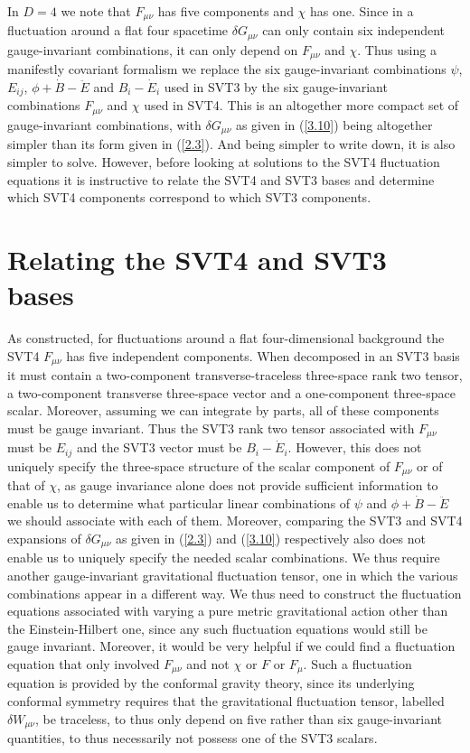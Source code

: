 \documentclass[aps,onecolumn,10pt]{revtex4}
\numberwithin{equation}{section}
\numberwithin{equation}{section}
\begin{document}
In $D=4$ we note that $F_{\mu\nu}$ has five components and $\chi$ has one. Since in a fluctuation around a flat four spacetime $\delta G_{\mu\nu}$ can only contain six independent gauge-invariant combinations, it can only depend on $F_{\mu\nu}$ and $\chi$. Thus using a manifestly covariant formalism we replace the six gauge-invariant combinations $\psi$, $E_{ij}$,  $\phi+\dot{B}-\ddot{E}$ and $B_i-\dot{E}_i$ used in SVT3 by the six gauge-invariant combinations $F_{\mu\nu}$ and $\chi$ used in SVT4. This is an altogether more compact set of gauge-invariant combinations, with $\delta G_{\mu\nu}$ as given in (\ref{3.10}) being altogether simpler than its form given in (\ref{2.3}). And being simpler to write down, it is also simpler to solve. However, before looking at solutions to the SVT4 fluctuation equations it is instructive to relate the SVT4 and SVT3 bases and determine which SVT4 components correspond to which SVT3 components.


\section{Relating the SVT4 and SVT3 bases}
\label{S4}

As constructed, for fluctuations around a flat four-dimensional background the SVT4 $F_{\mu\nu}$ has five independent components. When decomposed in an SVT3 basis it must contain a two-component transverse-traceless three-space rank two tensor, a two-component transverse three-space vector and a one-component three-space scalar. Moreover, assuming we can integrate by parts, all of these components must be gauge invariant. Thus the SVT3 rank two tensor associated with $F_{\mu\nu}$ must be $E_{ij}$ and the SVT3 vector must be  $B_i-\dot{E}_i$. However, this does not uniquely specify the three-space structure of the scalar component of $F_{\mu\nu}$ or of that of $\chi$, as gauge invariance alone does not provide sufficient information to enable us to determine what particular linear combinations of  $\psi$ and  $\phi+\dot{B}-\ddot{E}$ we should associate with each of them. Moreover, comparing the SVT3 and SVT4 expansions of $\delta G_{\mu\nu}$ as given in (\ref{2.3}) and (\ref{3.10}) respectively also does not enable us to uniquely specify the needed scalar combinations. We thus require another gauge-invariant gravitational fluctuation tensor, one in which the various combinations appear in a different way. We thus need to construct the fluctuation equations associated with varying a pure metric gravitational action other than the Einstein-Hilbert one, since any such fluctuation equations would still be gauge invariant. Moreover, it would be very helpful if we could find a fluctuation equation that only involved $F_{\mu\nu}$ and not $\chi$ or $F$ or $F_{\mu}$. Such a fluctuation equation is provided by the conformal gravity theory, since its underlying conformal symmetry requires that the gravitational fluctuation tensor,  labelled $\delta W_{\mu\nu}$, be traceless, to thus only depend on five rather than six gauge-invariant quantities, to thus necessarily not possess one of the SVT3 scalars.
\end{document}
